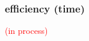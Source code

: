 \subsubsection{efficiency (time)}
%
\textcolor{red}{(in process)}

\begin{comment}
time needed for each judgement based on method from (Coertjens_et_al_2017).

statistical efficiency has been researched on \citet{Leijon_et_al_2019} and \citet{Pritikin_2020} for the bayesian dichotomous BTL model and the ordinal BTL model, respectively.
\end{comment}
%
%